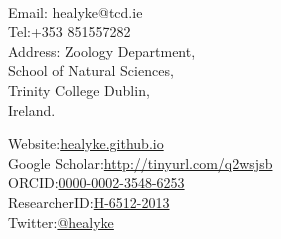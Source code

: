 \documentclass[10pt,a4paper]{article}
\begin{document}
\par{\smallskip\par}

\large{}\\

\par{\normalsize{}\bigskip\par}


\begin{minipage}[t]{0.5\textwidth}
\raggedright

Email:  healyke@tcd.ie\\
Tel:\hspace{0mm}+353 851557282\\
Address: Zoology Department,\\
\hspace{0mm}School of Natural Sciences,\\
\hspace{0mm}Trinity College Dublin,\\ 
\hspace{0mm}Ireland.\\

\end{minipage}
\begin{minipage}[t]{0.45\textwidth}

Website:\href{http://healyke.github.io}{healyke.github.io}\\
Google Scholar:\href{http://scholar.google.com/citations?user=5Kb9u8EAAAAJ}{http://tinyurl.com/q2wsjsb}\\
ORCID:\href{http://orcid.org/0000-0002-3548-6253}{0000-0002-3548-6253}\\
ResearcherID:\href{http://www.researcherid.com/rid/H-6512-2013}{H-6512-2013}\\
Twitter:\href{https://twitter.com/healyke}{@healyke}\\
\end{minipage}

\bigskip

\end{document}
